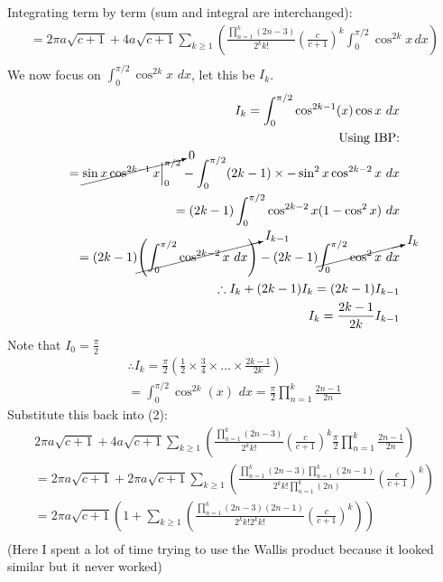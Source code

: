 \documentclass{article}
\begin{document}
Integrating term by term (sum and integral are interchanged):
\begin{equation}
\begin{split}
	= 2\pi a\sqrt{c+1} +
	4a\sqrt{c+1}\sum_{k\geq 1}\left( \frac{\prod_{n=1}^{k}(2n-3)}{2^kk!}\left(\frac{c}{c+1}\right)^k\int_{0}^{\pi/2}\cos^{2k}x\,dx\right)\\
\end{split}
\end{equation}
We now focus on $\int_{0}^{\pi/2}\cos^{2k}x\,\,dx$, let this be $I_k$.
\begin{equation*}
\begin{split}
	I_k = \int_{0}^{\pi/2}\cos^{2k-1}(x)\cos x\,\,dx\\
	\text{Using IBP:}\\
	= \cancelto{0}{\sin x\cos^{2k-1}x\Big|_{0}^{\pi/2}} - \int_{0}^{\pi/2}(2k-1)\times-\sin^2x\cos^{2k-2}x\,\,dx\\
	= (2k-1)\int_{0}^{\pi/2}\cos^{2k-2}x(1-\cos^2x)\,\,dx\\
	= (2k-1)\cancelto{I_{k-1}}{\left(\int_{0}^{\pi/2}\cos^{2k-2}x\,\,dx\right)} - (2k-1)\cancelto{I_k}{\int_{0}^{\pi/2}\cos^2x\,\,dx}\\
	\therefore I_k + (2k-1)I_k = (2k-1)I_{k-1}\\
	I_k = \frac{2k-1}{2k}I_{k-1}
\end{split}
\end{equation*}
Note that $I_0 = \frac{\pi}{2}$
\begin{equation*}
\begin{split}
	\therefore I_k = \frac{\pi}{2}\left(\frac{1}{2}\times\frac{3}{4}\times\dots\times\frac{2k-1}{2k}\right)\\
	= \int_{0}^{\pi/2}\cos^{2k}(x)\,\,dx = \frac{\pi}{2}\prod_{n=1}^{k}\frac{2n-1}{2n}
\end{split}
\end{equation*}
Substitute this back into (2):
\begin{equation}
\begin{split}
	2\pi a\sqrt{c+1} +
	4a\sqrt{c+1}\sum_{k\geq 1}\left( \frac{\prod_{n=1}^{k}(2n-3)}{2^kk!}\left(\frac{c}{c+1}\right)^k\frac{\pi}{2}\prod_{n=1}^{k}\frac{2n-1}{2n}\right)\\
	= 2\pi a\sqrt{c+1} +
	2\pi a\sqrt{c+1}\sum_{k\geq 1}\left( \frac{\prod_{n=1}^{k}(2n-3)\prod_{n=1}^{k}(2n-1)}{2^kk!\prod_{n=1}^k(2n)}\left(\frac{c}{c+1}\right)^k\right)\\
	= 2\pi a\sqrt{c+1} \left(1 + 
	\sum_{k\geq 1}\left( \frac{\prod_{n=1}^{k}(2n-3)(2n-1)}{2^kk!2^kk!}\left(\frac{c}{c+1}\right)^k\right)\right)\\
\end{split}
\end{equation}
(Here I spent a lot of time trying to use the Wallis product because it looked similar but it never worked)\\\\
\end{document}
